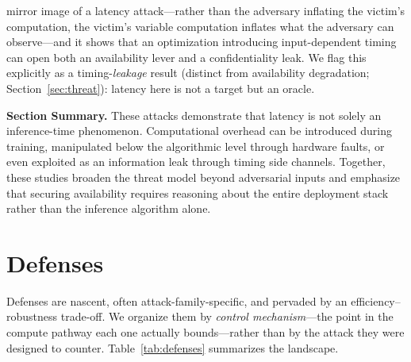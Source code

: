 \documentclass[acmsmall,screen,review,nonacm]{acmart}
\begin{document}
mirror image of a latency attack---rather than the adversary inflating the victim's computation, the victim's variable computation inflates what the adversary can observe---and it shows that an optimization introducing input-dependent timing can open both an availability lever and a confidentiality leak. We flag this explicitly as a timing-\emph{leakage} result (distinct from availability degradation; Section~\ref{sec:threat}): latency here is not a target but an oracle.

\textbf{Section Summary.} These attacks demonstrate that latency is not solely an inference-time phenomenon. Computational overhead can be introduced during training, manipulated below the algorithmic level through hardware faults, or even exploited as an information leak through timing side channels. Together, these studies broaden the threat model beyond adversarial inputs and emphasize that securing availability requires reasoning about the entire deployment stack rather than the inference algorithm alone.
\section{Defenses}
\label{sec:defenses}

Defenses are nascent, often attack-family-specific, and pervaded by an efficiency--robustness trade-off. We organize them by \emph{control mechanism}---the point in the compute pathway each one actually bounds---rather than by the attack they were designed to counter. Table~\ref{tab:defenses} summarizes the landscape.
\end{document}
